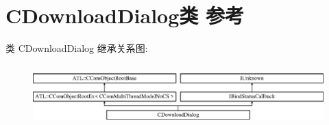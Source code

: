 \hypertarget{class_c_download_dialog}{}\section{C\+Download\+Dialog类 参考}
\label{class_c_download_dialog}
类 C\+Download\+Dialog 继承关系图\+:\begin{figure}[H]
\begin{center}
\leavevmode
\includegraphics[height=2.386364cm]{class_c_download_dialog}
\end{center}
\end{figure}
